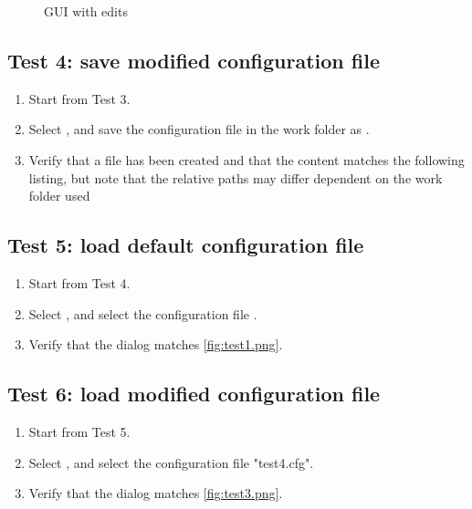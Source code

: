 \begin{enumerate}
\begin{figure}[H]
\caption{GUI with edits}
\label{fig:test3.png}
\end{figure}
\end{enumerate}

\subsection{Test 4: save modified configuration file}
\begin{enumerate}
\item Start from Test 3.
\item Select  \textrightarrow {}, and save the configuration file in the work folder as .
\item Verify that a file  has been created and that the content matches the following listing, but note that the relative paths may differ dependent on the work folder used

\end{enumerate}

\subsection{Test 5: load default configuration file}
\begin{enumerate}
\item Start from Test 4.
\item Select  \textrightarrow {}, and select the configuration file .
\item Verify that the dialog matches \autoref{fig:test1.png}.
\end{enumerate}

\subsection{Test 6: load modified configuration file}
\begin{enumerate}
\item Start from Test 5.
\item Select  \textrightarrow {}, and select the configuration file "test4.cfg".
\item Verify that the dialog matches \autoref{fig:test3.png}.
\end{enumerate}

